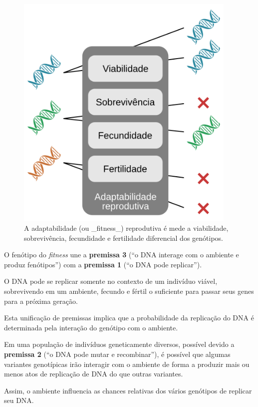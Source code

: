 \documentclass[
]{book}
\begin{document}
\begin{figure}

{\centering \includegraphics[width=400px]{figs/fitness_scheme} 

}

\caption{A adaptabilidade (ou _fitness_) reprodutiva é mede a viabilidade, sobrevivência, fecundidade e fertilidade diferencial dos genótipos.}\label{fig:fitness}
\end{figure}

O fenótipo do \emph{fitness} une a \textbf{premissa 3} (``o DNA interage com o ambiente e produz fenótipos'') com a \textbf{premissa 1} (``o DNA pode replicar'').

O DNA pode se replicar somente no contexto de um indivíduo viável, sobrevivendo em um ambiente, fecundo e fértil o suficiente para passar seus genes para a próxima geração.

Esta unificação de premissas implica que a probabilidade da replicação do DNA é determinada pela interação do genótipo com o ambiente.

Em uma população de indivíduos geneticamente diversos, possível devido a \textbf{premissa 2} (``o DNA pode mutar e recombinar''), é possível que algumas variantes genotípicas irão interagir com o ambiente de forma a produzir mais ou menos atos de replicação de DNA do que outras variantes.

Assim, o ambiente influencia as chances relativas dos vários genótipos de replicar seu DNA.
\end{document}
